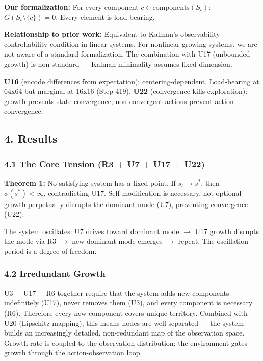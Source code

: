 \documentclass[
  11pt,
]{article}
\begin{document}
\textbf{Our formalization:} For every component
\(c \in \text{components}(S_t)\): \(G(S_t \setminus \{c\}) = 0\). Every
element is load-bearing.

\textbf{Relationship to prior work:} Equivalent to Kalman's
observability + controllability condition in linear systems. For
nonlinear growing systems, we are not aware of a standard formalization.
The combination with U17 (unbounded growth) is non-standard --- Kalman
minimality assumes fixed dimension.

\textbf{U16} (encode differences from expectation): centering-dependent.
Load-bearing at 64x64 but marginal at 16x16 (Step 419). \textbf{U22}
(convergence kills exploration): growth prevents state convergence;
non-convergent actions prevent action convergence.

\subsection{4. Results}\label{results}

\subsubsection{4.1 The Core Tension (R3 + U7 + U17 +
U22)}\label{the-core-tension-r3-u7-u17-u22}

\textbf{Theorem 1:} No satisfying system has a fixed point. If
\(s_t \to s^*\), then \(\phi(s^*) < \infty\), contradicting U17.
Self-modification is necessary, not optional --- growth perpetually
disrupts the dominant mode (U7), preventing convergence (U22).

The system oscillates: U7 drives toward dominant mode \(\to\) U17 growth
disrupts the mode via R3 \(\to\) new dominant mode emerges \(\to\)
repeat. The oscillation period is a degree of freedom.

\subsubsection{4.2 Irredundant Growth}\label{irredundant-growth}

U3 + U17 + R6 together require that the system adds new components
indefinitely (U17), never removes them (U3), and every component is
necessary (R6). Therefore every new component covers unique territory.
Combined with U20 (Lipschitz mapping), this means nodes are
well-separated --- the system builds an increasingly detailed,
non-redundant map of the observation space. Growth rate is coupled to
the observation distribution: the environment gates growth through the
action-observation loop.
\end{document}
